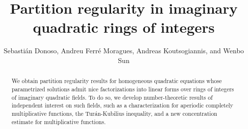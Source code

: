 \documentclass[11pt]{amsart}
\author{Sebasti\'an Donoso, Andreu Ferr\'e Moragues, Andreas Koutsogiannis, and Wenbo Sun}
\title{Partition regularity in imaginary quadratic rings of integers}
\theoremstyle{definition}
\newcommand{\SD}[1]{{\color{green!60!black}{{#1}}}}
\newcommand{\AK}[1]{{\color{ForestGreen}{{#1}}}}
\begin{document}
\begin{abstract}

 
We obtain partition regularity results for homogeneous quadratic equations whose parametrized solutions admit nice factorizations into linear forms over rings of integers of imaginary quadratic fields. To do so, we develop number-theoretic results of independent interest on such fields, such as  a characterization for aperiodic completely multiplicative functions, the Tur\'an-Kubilius inequality, and a new concentration estimate for multiplicative functions. 


 



\end{abstract}
\maketitle
\tableofcontents

\end{document}
